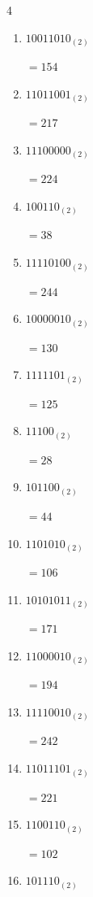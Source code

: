 \begin{multicols}{4}
\begin{enumerate}
        $=29$

  \item $10011010_{(2)}$

        $=154$

  \item $11011001_{(2)}$

        $=217$

  \item $11100000_{(2)}$

        $=224$

  \item $100110_{(2)}$

        $=38$

  \item $11110100_{(2)}$

        $=244$

  \item $10000010_{(2)}$

        $=130$

  \item $1111101_{(2)}$

        $=125$

  \item $11100_{(2)}$

        $=28$

  \item $101100_{(2)}$

        $=44$

  \item $1101010_{(2)}$

        $=106$

  \item $10101011_{(2)}$

        $=171$

  \item $11000010_{(2)}$

        $=194$

  \item $11110010_{(2)}$

        $=242$

  \item $11011101_{(2)}$

        $=221$

\columnbreak %

  \item $1100110_{(2)}$

        $=102$

  \item $101110_{(2)}$


\end{enumerate}
\end{multicols}
